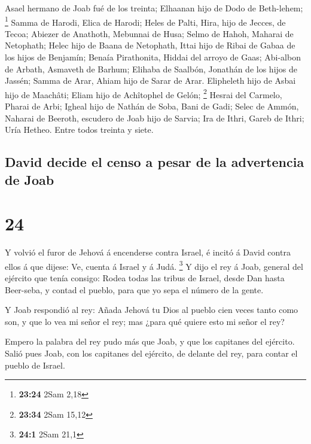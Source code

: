  Asael hermano de Joab fué de los treinta; Elhaanan hijo de
Dodo de Beth-lehem; \footnote{\textbf{23:24} 2Sam 2,18} 
Samma de Harodi, Elica de Harodi;  Heles de Palti, Hira,
hijo de Jecces, de Tecoa;  Abiezer de Anathoth, Mebunnai de
Husa;  Selmo de Hahoh, Maharai de Netophath; 
Helec hijo de Baana de Netophath, Ittai hijo de Ribai de Gabaa de los
hijos de Benjamín;  Benaía Pirathonita, Hiddai del arroyo
de Gaas;  Abi-albon de Arbath, Asmaveth de Barhum;
 Elihaba de Saalbón, Jonathán de los hijos de Jassén;
 Samma de Arar, Ahiam hijo de Sarar de Arar. 
Elipheleth hijo de Asbai hijo de Maachâti; Eliam hijo de Achîtophel de
Gelón; \footnote{\textbf{23:34} 2Sam 15,12}  Hesrai del
Carmelo, Pharai de Arbi;  Igheal hijo de Nathán de Soba,
Bani de Gadi;  Selec de Ammón, Naharai de Beeroth, escudero
de Joab hijo de Sarvia;  Ira de Ithri, Gareb de Ithri;
 Uría Hetheo. Entre todos treinta y siete.

\hypertarget{david-decide-el-censo-a-pesar-de-la-advertencia-de-joab}{%
\subsection{David decide el censo a pesar de la advertencia de
Joab}\label{david-decide-el-censo-a-pesar-de-la-advertencia-de-joab}}

\hypertarget{section-23}{%
\section{24}\label{section-23}}

 Y volvió el furor de Jehová á encenderse contra Israel, é
incitó á David contra ellos á que dijese: Ve, cuenta á Israel y á Judá.
\footnote{\textbf{24:1} 2Sam 21,1}  Y dijo el rey á Joab,
general del ejército que tenía consigo: Rodea todas las tribus de
Israel, desde Dan hasta Beer-seba, y contad el pueblo, para que yo sepa
el número de la gente.

 Y Joab respondió al rey: Añada Jehová tu Dios al pueblo
cien veces tanto como son, y que lo vea mi señor el rey; mas ¿para qué
quiere esto mi señor el rey?

 Empero la palabra del rey pudo más que Joab, y que los
capitanes del ejército. Salió pues Joab, con los capitanes del ejército,
de delante del rey, para contar el pueblo de Israel.


